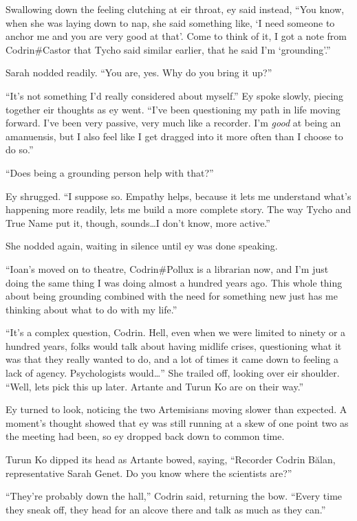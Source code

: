 Swallowing down the feeling clutching at eir throat, ey said instead, ``You know, when she was laying down to nap, she said something like, `I need someone to anchor me and you are very good at that'. Come to think of it, I got a note from Codrin\#Castor that Tycho said similar earlier, that he said I'm `grounding'.''

Sarah nodded readily. ``You are, yes. Why do you bring it up?''

``It's not something I'd really considered about myself.'' Ey spoke slowly, piecing together eir thoughts as ey went. ``I've been questioning my path in life moving forward. I've been very passive, very much like a recorder. I'm \emph{good} at being an amanuensis, but I also feel like I get dragged into it more often than I choose to do so.''

``Does being a grounding person help with that?''

Ey shrugged. ``I suppose so. Empathy helps, because it lets me understand what's happening more readily, lets me build a more complete story. The way Tycho and True Name put it, though, sounds\ldots I don't know, more active.''

She nodded again, waiting in silence until ey was done speaking.

``Ioan's moved on to theatre, Codrin\#Pollux is a librarian now, and I'm just doing the same thing I was doing almost a hundred years ago. This whole thing about being grounding combined with the need for something new just has me thinking about what to do with my life.''

``It's a complex question, Codrin. Hell, even when we were limited to ninety or a hundred years, folks would talk about having midlife crises, questioning what it was that they really wanted to do, and a lot of times it came down to feeling a lack of agency. Psychologists would\ldots{}'' She trailed off, looking over eir shoulder. ``Well, lets pick this up later. Artante and Turun Ko are on their way.''

Ey turned to look, noticing the two Artemisians moving slower than expected. A moment's thought showed that ey was still running at a skew of one point two as the meeting had been, so ey dropped back down to common time.

Turun Ko dipped its head as Artante bowed, saying, ``Recorder Codrin Bălan, representative Sarah Genet. Do you know where the scientists are?''

``They're probably down the hall,'' Codrin said, returning the bow. ``Every time they sneak off, they head for an alcove there and talk as much as they can.''

